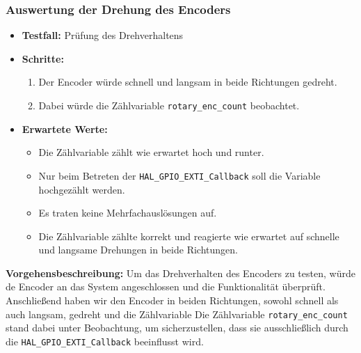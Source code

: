 \subsubsection{Auswertung der Drehung des Encoders}
\begin{itemize}
	\item \textbf{Testfall:} Prüfung des Drehverhaltens
	\item \textbf{Schritte:}
	\begin{enumerate}
		\item Der Encoder würde schnell und langsam in beide Richtungen gedreht.
		\item Dabei würde die Zählvariable \texttt{rotary\_enc\_count} beobachtet.
	\end{enumerate}
	\item \textbf{Erwartete Werte:}
	\begin{itemize}
		\item Die Zählvariable zählt wie erwartet hoch und runter.
		\item Nur beim Betreten der \texttt{HAL\_GPIO\_EXTI\_Callback} soll die Variable hochgezählt werden.
	\end{itemize}
	\begin{itemize}
		\item Es traten keine Mehrfachauslösungen auf.
		\item Die Zählvariable zählte korrekt und reagierte wie erwartet auf schnelle und langsame Drehungen in beide Richtungen.
	\end{itemize}
\end{itemize}




\textbf{Vorgehensbeschreibung:}
Um das Drehverhalten des Encoders zu testen, würde de Encoder an das System angeschlossen und die Funktionalität überprüft. Anschließend haben wir den Encoder in beiden Richtungen, sowohl schnell als auch langsam, gedreht und die Zählvariable 
Die Zählvariable \texttt{rotary\_enc\_count} stand dabei unter Beobachtung, um sicherzustellen, dass sie ausschließlich durch die \texttt{HAL\_GPIO\_EXTI\_Callback} beeinflusst wird.


